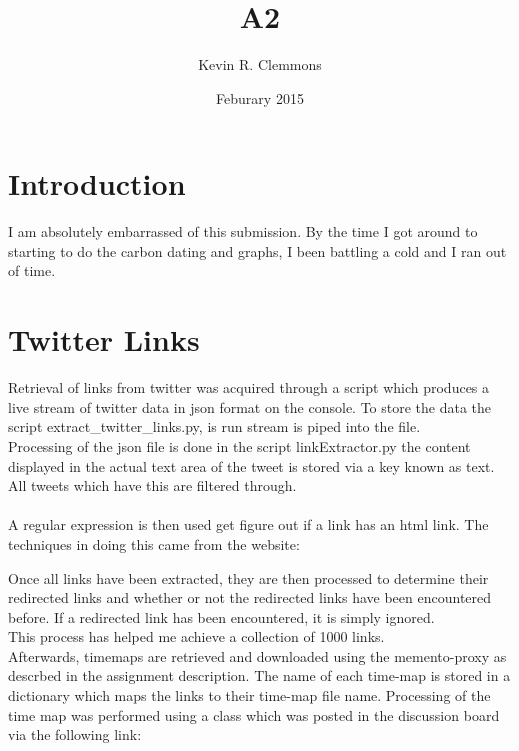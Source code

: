 \documentclass[a4paper,12pt]{article}
\title{A2}
\author{Kevin R. Clemmons}
\date{Feburary 2015}
\begin{document}
\maketitle
\newpage 
%
\section{Introduction} 
I am absolutely embarrassed of this submission. By the time I got around to starting to do the carbon dating and graphs, I been battling a cold and I ran out of time.

\section{Twitter Links}
Retrieval of links from twitter was acquired through a script which produces a live stream of twitter data in json format on the console. To store the data the script extract_twitter_links.py, is run stream is piped into the file. \\ 
Processing of the json file is done in the script linkExtractor.py the content displayed in the actual text area of the tweet is stored via a key known as text. All tweets which have this are filtered through. \\ \\ 
A regular expression is then used get figure out if a link has an html link. The techniques in doing this came from the website:   
Once all links have been extracted, they are then processed to determine their redirected links and whether or not the redirected links have been encountered before. If a redirected link has been encountered, it is simply ignored. \\
This process has helped me achieve a collection of 1000 links. \\
Afterwards, timemaps are retrieved and downloaded using the memento-proxy as descrbed in the assignment description. The name of each time-map is stored in a dictionary which maps the links to their time-map file name. Processing of the time map was performed using a class which was posted in the discussion board via the following link: 
\end{document}
